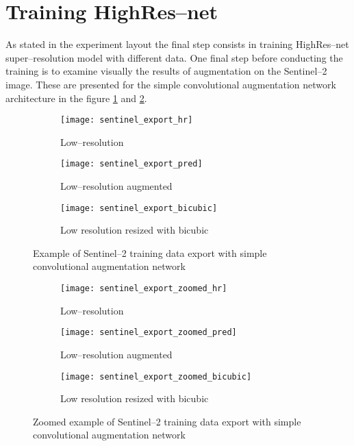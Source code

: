 \section{Training HighRes--net}
As stated in the experiment layout the final step consists in training HighRes--net super--resolution model with different data.
One final step before conducting the training is to examine visually the results of augmentation on the Sentinel--2 image.
These are presented for the simple convolutional augmentation network architecture in the figure \ref{fig:export-example} and \ref{fig:export-example-zoomed}.
\begin{figure}
    \begin{subfigure}[t]{0.3\textwidth}
        \centering
        \texttt{[image: sentinel\_export\_hr]}
        \caption{Low--resolution}
    \end{subfigure}
    \hfill
    \begin{subfigure}[t]{0.3\textwidth}
        \centering
        \texttt{[image: sentinel\_export\_pred]}
        \caption{Low--resolution augmented}
    \end{subfigure}
    \hfill
    \begin{subfigure}[t]{0.3\textwidth}
        \centering
        \texttt{[image: sentinel\_export\_bicubic]}
        \caption{Low resolution resized with bicubic}
    \end{subfigure}
    \caption{Example of Sentinel--2 training data export with simple convolutional augmentation network}
    \label{fig:export-example}
\end{figure}
\begin{figure}
    \begin{subfigure}[t]{0.3\textwidth}
        \centering
        \texttt{[image: sentinel\_export\_zoomed\_hr]}
        \caption{Low--resolution}
    \end{subfigure}
    \hfill
    \begin{subfigure}[t]{0.3\textwidth}
        \centering
        \texttt{[image: sentinel\_export\_zoomed\_pred]}
        \caption{Low--resolution augmented}
    \end{subfigure}
    \hfill
    \begin{subfigure}[t]{0.3\textwidth}
        \centering
        \texttt{[image: sentinel\_export\_zoomed\_bicubic]}
        \caption{Low resolution resized with bicubic}
    \end{subfigure}
    \caption{Zoomed example of Sentinel--2 training data export with simple convolutional augmentation network}
    \label{fig:export-example-zoomed}
\end{figure}

